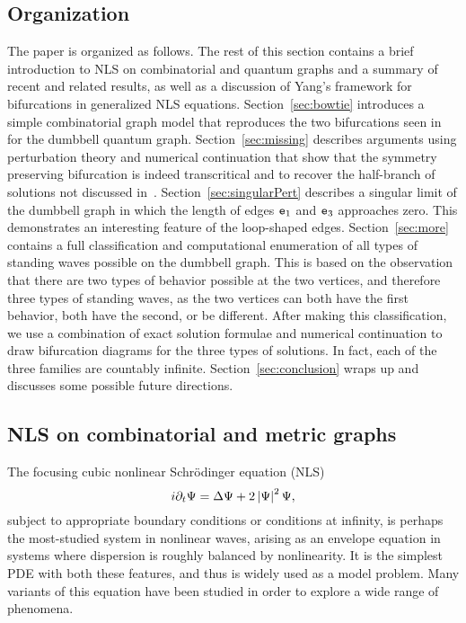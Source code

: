 \documentclass{article}
\numberwithin{equation}{section}
\numberwithin{figure}{section}
\begin{document}
\subsection{Organization}
The paper is organized as follows. 
%
The rest of this section contains a brief introduction to NLS on combinatorial and quantum graphs and a summary of recent and related results, as well as a discussion of Yang's framework for bifurcations in generalized NLS equations.	
%
Section~\ref{sec:bowtie} introduces a simple combinatorial graph model that reproduces the two bifurcations seen in~\cite{Marzuola:2016bl} for the dumbbell quantum graph. 
%
Section~\ref{sec:missing} describes arguments using perturbation theory and numerical continuation that show that the symmetry preserving bifurcation is indeed transcritical and to recover the half-branch of solutions not discussed in~\cite{Marzuola:2016bl}. 
%
Section~\ref{sec:singularPert} describes a singular limit of the dumbbell graph in which the length of edges $\mathtt{e}_1$ and $\mathtt{e}_3$ approaches zero. This demonstrates an interesting feature of the loop-shaped edges. 
%
Section~\ref{sec:more} contains a full classification and computational enumeration of all types of standing waves possible on the dumbbell graph. This is based on the observation that there are two types of behavior possible at the two vertices, and therefore three types of standing waves, as the two vertices can both have the first behavior, both have the second, or be different. After making this classification, we use a combination of exact solution formulae and numerical continuation to draw bifurcation diagrams for the three types of solutions. In fact, each of the three families are countably infinite.
%
Section~\ref{sec:conclusion} wraps up and discusses some possible future directions.


\subsection{NLS on combinatorial and metric graphs}

The focusing cubic nonlinear Schr\"odinger equation (NLS)
\begin{equation}
i \partial_t \Psi = \Delta \Psi  +2\left\lvert\Psi\right\rvert^2 \Psi,
\label{NLS}
\end{equation}
subject to appropriate boundary conditions or conditions at infinity, is perhaps the most-studied system in nonlinear waves, arising as an envelope equation in systems where  dispersion is roughly balanced by nonlinearity. It is the simplest PDE with both these features, and thus is widely used as a model problem. Many variants of this equation have been studied in order to explore a wide range of phenomena.
\end{document}
